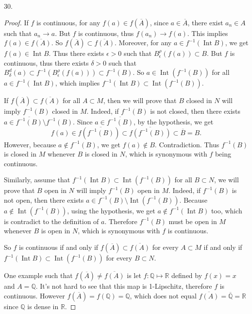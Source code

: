 \documentclass[12pt, a4paper]{article}
\theoremstyle{plain}
\newcommand{\Q}{\mathbb{Q}}
\newcommand{\R}{\mathbb{R}}
\DeclareMathOperator{\inter}{Int}
\begin{document}
30.
\begin{proof}
If $f$ is continuous, for any $f(a)\in f(\overline{A})$, since $a\in \overline{A}$, there exist $a_n\in A$ such that $a_n\rightarrow a$. But $f$ is continuous, thus $f(a_n)\rightarrow f(a)$. This implies $f(a)\in \overline{f(A)}$. So $f(\overline{A})\subset \overline{f(A)}$. Moreover, for any $a\in f^{-1}(\inter{B})$, we get $f(a)\in\inter{B}$. Thus there exists $\epsilon>0$ such that $B_\epsilon^\rho(f(a))\subset B$. But $f$ is continuous, thus there exists $\delta>0$ such that $B_\delta^d(a)\subset f^{-1}(B_\epsilon^\rho(f(a)))\subset f^{-1}(B)$. So $a\in \inter{(f^{-1}(B))}$ for all $a\in f^{-1}(\inter{B})$, which implies $f^{-1}(\inter{B})\subset \inter{(f^{-1}(B))}$.

If $f(\overline{A})\subset\overline{f(A)}$ for all $A\subset M$, then we will prove that $B$ closed in $N$ will imply $f^{-1}(B)$ closed in $M$. Indeed, if $f^{-1}(B)$ is not closed, then there exists $a\in \overline{f^{-1}(B)}\setminus f^{-1}(B)$. Since $a\in \overline{f^{-1}(B)}$, by the hypothesis, we get 
\[
f(a)\in f(\overline{f^{-1}(B)})\subset \overline{f(f^{-1}(B))}\subset\overline{B}=B.
\]
However, because $a\notin f^{-1}(B)$, we get $f(a)\notin B$. Contradiction. Thus $f^{-1}(B)$ is closed in $M$ whenever $B$ is closed in $N$, which is synonymous with $f$ being continuous. 

Similarly, assume that $f^{-1}(\inter{B})\subset \inter{(f^{-1}(B))}$ for all $B\subset N$, we will prove that $B$ open in $N$ will imply $f^{-1}(B)$ open in $M$. Indeed, if $f^{-1}(B)$ is not open, then there exists $a\in f^{-1}(B)\setminus\inter{(f^{-1}(B))}$. Because $a\notin \inter{(f^{-1}(B))}$, using the hypothesis, we get $a\notin f^{-1}(\inter{B})$ too, which is contradict to the definition of $a$. Therefore $f^{-1}(B)$ must be open in $M$ whenever $B$ is open in $N$, which is synonymous with $f$ is continuous.

So $f$ is continuous if and only if $f(\overline{A})\subset \overline{f(A)}$ for every $A\subset M$ if and only if $f^{-1}(\inter{B})\subset \inter{(f^{-1}(B))}$ for every $B\subset N$.

One example such that $f(\overline{A})\neq \overline{f(A)}$ is let $f:\Q\mapsto \R$ defined by $f(x)=x$ and $A=\Q$. It's not hard to see that this map is 1-Lipschitz, therefore $f$ is continuous. However $f(\overline{A})=f(\Q)=\Q$, which does not equal $\overline{f(A)}=\overline{\Q}=\R$ since $\Q$ is dense in $\R$.
\end{proof}
\end{document}
